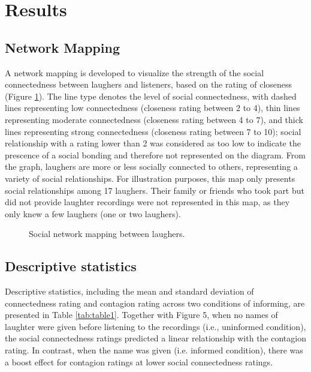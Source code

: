 \section{Results}
\subsection{Network Mapping}

A network mapping is developed to visualize the strength of the social connectedness between laughers and listeners, based on the rating of closeness (Figure \ref{fig:network}). The line type denotes the level of social connectedness, with dashed lines representing low connectedness (closeness rating between 2 to 4), thin lines representing moderate connectedness (closeness rating between 4 to 7), and thick lines representing strong connectedness (closeness rating between 7 to 10); social relationship with a rating lower than 2 was considered as too low to indicate the prescence of a social bonding and therefore not represented on the diagram. From the graph, laughers are more or less socially connected to others, representing a variety of social relationships. 
For illustration purposes, this map only presents social relationships among 17 laughers. Their family or friends who took part but did not provide laughter recordings were not represented in this map, as they only knew a few laughers (one or two laughers).

\begin{figure}[ht!]
\centering
\caption{Social network mapping between laughers.}
\label{fig:network}
\end{figure}

\subsection{Descriptive statistics}
Descriptive statistics, including the mean and standard deviation of connectedness rating and contagion rating across two conditions of informing, are presented in Table \ref{tab:table1}. Together with Figure 5, when no names of laughter were given before listening to the recordings (i.e., uninformed condition), the social connectedness ratings predicted a linear relationship with the contagion rating. In contrast, when the name was given (i.e. informed condition), there was a boost effect for contagion ratings at lower social connectedness ratings.



